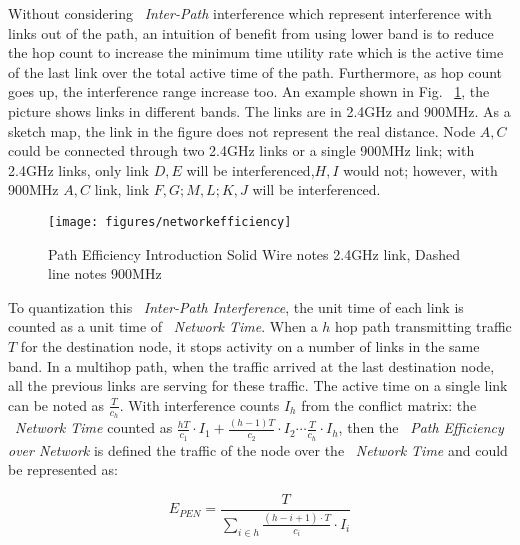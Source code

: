 Without considering ~\emph{Inter-Path} interference which represent interference with links out of the path, 
an intuition of benefit from using lower band is to reduce the hop count
 to increase the minimum time utility rate which is the active time of the last link over the total active time of the path. 
Furthermore, as hop count goes up, the interference range increase too. An example shown in Fig. ~\ref{fig:networkefficiency}, 
the picture shows links in different bands. The links are in 2.4GHz and 900MHz. As a sketch map, the link in the figure does not represent the real distance.
Node $A,C$ could be connected through two 2.4GHz links or a single 900MHz link; with 2.4GHz links, only link $D,E$ will be interferenced,$H,I$ would not; however, with 900MHz $A,C$ link, link $F,G;M,L;K,J$ will be interferenced. 

\begin{figure}
\centering
\texttt{[image: figures/networkefficiency]}
\vspace{-0.1in}
\caption{Path Efficiency Introduction Solid Wire notes 2.4GHz link, Dashed line notes 900MHz}
\label{fig:networkefficiency}
\end{figure}

To quantization this ~\emph{Inter-Path Interference}, 
the unit time of each link is counted as a unit time of ~\emph{Network Time}. 
When a $h$ hop path transmitting traffic $T$ for the destination node, it stops activity on a number of links in the same band. 
In a multihop path, when the traffic arrived at the last destination node, all the previous links are serving for these traffic.
The active time on a single link can be noted as 
$\frac{T}{c_h}$. 
With interference counts $I_h$ from the conflict matrix:
the ~\emph{Network Time} counted as 
$\frac{hT}{c_1}\cdot I_1 + \frac{(h-1)T}{c_2}\cdot I_2 \cdots \frac{T}{c_h}\cdot I_h$, 
then the ~\emph{Path Efficiency over Network} is defined the traffic of the node over the ~\emph{Network Time} and could be represented as:



\begin{equation}
\label{eq:originpen}
E_{PEN}=\frac{T}{\sum_{i \in h}\frac{(h-i+1)\cdot T}{c_i}\cdot I_i }
\end{equation}

